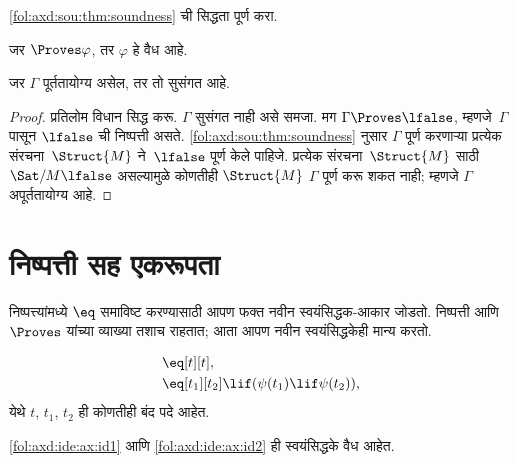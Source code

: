\begin{prob}
  \ref{fol:axd:sou:thm:soundness} ची सिद्धता पूर्ण करा.
\end{prob}


\begin{cor}
\label{fol:axd:sou:cor:weak-soundness}
जर $\Proves \varphi$, तर $\varphi$ हे वैध आहे.
\end{cor}

\begin{cor}
\label{fol:axd:sou:cor:consistency-soundness}
जर $\Gamma$ पूर्ततायोग्य असेल, तर तो सुसंगत आहे.
\end{cor}

\begin{proof}
प्रतिलोम विधान सिद्ध करू. $\Gamma$ सुसंगत नाही असे समजा. मग
$\Gamma \Proves \lfalse$, म्हणजे~$\Gamma$ पासून $\lfalse$ ची
निष्पत्ती असते. \ref{fol:axd:sou:thm:soundness} नुसार $\Gamma$ पूर्ण करणाऱ्या
प्रत्येक
संरचना~$\Struct{M}$
ने~$\lfalse$ पूर्ण केले पाहिजे. प्रत्येक
संरचना~$\Struct{M}$ साठी
  $\Sat/{M}{\lfalse}$ असल्यामुळे कोणतीही
$\Struct{M}$ $\Gamma$ पूर्ण करू शकत नाही;
म्हणजे $\Gamma$ अपूर्ततायोग्य आहे.
\end{proof}














\section{निष्पत्ती सह एकरूपता}\label{fol:axd:ide:sec}

निष्पत्त्यांमध्ये $\eq$ समाविष्ट करण्यासाठी आपण फक्त नवीन
स्वयंसिद्धक-आकार जोडतो. निष्पत्ती आणि $\Proves$ यांच्या व्याख्या
तशाच राहतात; आता आपण नवीन स्वयंसिद्धकेही मान्य करतो.

\begin{defn}[एकरूपता साठीची स्वयंसिद्धके]
\begin{align}
\label{fol:axd:ide:ax:id1} & \eq[t][t], \\
\label{fol:axd:ide:ax:id2} & \eq[t_1][t_2] \lif (\psi(t_1) \lif
  \psi(t_2)),
\end{align}
येथे $t$, $t_1$, $t_2$ ही कोणतीही बंद पदे आहेत.
\end{defn}

\begin{prop}\label{fol:axd:ide:prop:sound}
  \ref{fol:axd:ide:ax:id1} आणि \ref{fol:axd:ide:ax:id2} ही स्वयंसिद्धके वैध आहेत.
\end{prop}

